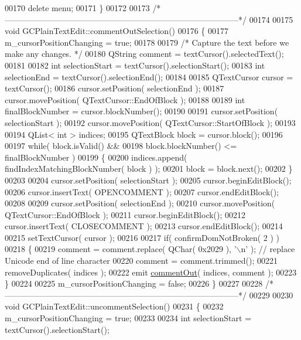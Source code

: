 \begin{DoxyCode}
00170   \textcolor{keyword}{delete} menu;
00171 \}
00172 
00173 \textcolor{comment}{/*
      --------------------------------------------------------------------------------------*/}
00174 
00175 \textcolor{keywordtype}{void} GCPlainTextEdit::commentOutSelection()
00176 \{
00177   m\_cursorPositionChanging = \textcolor{keyword}{true};
00178 
00179   \textcolor{comment}{/* Capture the text before we make any changes. */}
00180   QString comment = textCursor().selectedText();
00181 
00182   \textcolor{keywordtype}{int} selectionStart = textCursor().selectionStart();
00183   \textcolor{keywordtype}{int} selectionEnd = textCursor().selectionEnd();
00184 
00185   QTextCursor cursor = textCursor();
00186   cursor.setPosition( selectionEnd );
00187   cursor.movePosition( QTextCursor::EndOfBlock );
00188 
00189   \textcolor{keywordtype}{int} finalBlockNumber = cursor.blockNumber();
00190 
00191   cursor.setPosition( selectionStart );
00192   cursor.movePosition( QTextCursor::StartOfBlock );
00193 
00194   QList< int > indices;
00195   QTextBlock block = cursor.block();
00196 
00197   \textcolor{keywordflow}{while}( block.isValid() &&
00198          block.blockNumber() <= finalBlockNumber )
00199   \{
00200     indices.append( findIndexMatchingBlockNumber( block ) );
00201     block = block.next();
00202   \}
00203 
00204   cursor.setPosition( selectionStart );
00205   cursor.beginEditBlock();
00206   cursor.insertText( OPENCOMMENT );
00207   cursor.endEditBlock();
00208 
00209   cursor.setPosition( selectionEnd );
00210   cursor.movePosition( QTextCursor::EndOfBlock );
00211   cursor.beginEditBlock();
00212   cursor.insertText( CLOSECOMMENT );
00213   cursor.endEditBlock();
00214 
00215   setTextCursor( cursor );
00216 
00217   \textcolor{keywordflow}{if}( confirmDomNotBroken( 2 ) )
00218   \{
00219     comment = comment.replace( QChar( 0x2029 ), \textcolor{charliteral}{'\(\backslash\)n'} );    \textcolor{comment}{// replace Unicode
       end of line character}
00220     comment = comment.trimmed();
00221     removeDuplicates( indices );
00222     emit \hyperlink{class_g_c_plain_text_edit_a5df13199f02cf478a436689d52924201}{commentOut}( indices, comment );
00223   \}
00224 
00225   m\_cursorPositionChanging = \textcolor{keyword}{false};
00226 \}
00227 
00228 \textcolor{comment}{/*
      --------------------------------------------------------------------------------------*/}
00229 
00230 \textcolor{keywordtype}{void} GCPlainTextEdit::uncommentSelection()
00231 \{
00232   m\_cursorPositionChanging = \textcolor{keyword}{true};
00233 
00234   \textcolor{keywordtype}{int} selectionStart = textCursor().selectionStart();

\end{DoxyCode}
